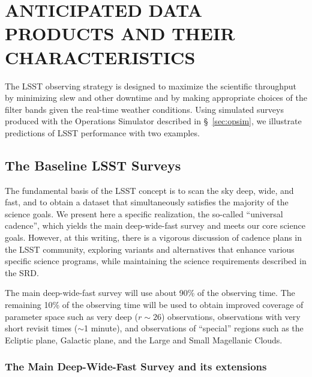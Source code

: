 \section{  ANTICIPATED DATA PRODUCTS AND THEIR CHARACTERISTICS    }
\label{Sec:dataprod}

The LSST observing strategy is designed to maximize the scientific
throughput by minimizing slew and other downtime and by making appropriate
choices of the filter bands given the real-time weather conditions.
Using simulated surveys produced with the Operations Simulator described in \S~\ref{sec:opsim},
we illustrate predictions of LSST performance with two examples.


\subsection{ The Baseline LSST Surveys }
\label{sec:baseline}

The fundamental basis of the LSST concept is to scan the sky deep, wide, and
fast, and to obtain a dataset that simultaneously satisfies the majority
of the science goals. We present here a specific realization, the
so-called ``universal cadence'', which yields the main deep-wide-fast
survey and meets our core science goals.  However, at this writing,
there is a vigorous discussion of cadence plans in the LSST community,
exploring variants and alternatives that enhance various specific
science programs, while maintaining the science requirements described
in the SRD.

The main deep-wide-fast survey %
will use about 90\% of the observing time. The remaining 10\% of the observing
time will be used to obtain improved coverage of parameter space such as
very deep ($r\sim26$) observations, observations with very short revisit
times ($\sim$1 minute), and observations of ``special'' regions such as the
Ecliptic plane, Galactic plane, and the Large and Small Magellanic Clouds.

\subsubsection{ The Main Deep-Wide-Fast Survey and its extensions}

